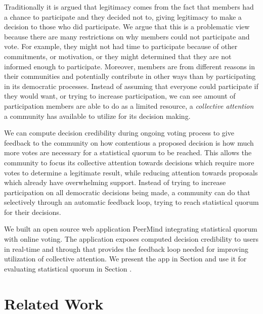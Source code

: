 \documentclass[chi_draft]{sigchi}
\begin{document}
Traditionally it is argued that legitimacy comes from the fact that members had a chance to participate
and they decided not to, giving legitimacy to make a decision to those who did participate.
We argue that this is a problematic view because there are many restrictions on why members could not
participate and vote.
For example, they might not had time to participate because of other commitments, or motivation, or they might determined
that they are not informed enough to participate.
Moreover, members are from different reasons in their communities and potentially contribute in other ways
than by participating in its democratic processes.
Instead of assuming that everyone could participate if they would want, or trying to increase participation,
we can see amount of participation members are able to do as a limited resource, a \emph{collective attention}
a community has available to utilize for its decision making.

We can compute decision credibility during ongoing voting process to give feedback to the community
on how contentious a proposed decision is how much more votes are necessary for a statistical quorum
to be reached.
This allows the community to focus its collective attention towards decisions which require more votes
to determine a legitimate result, while reducing attention towards proposals which already have overwhelming support.
Instead of trying to increase participation on all democratic decisions being made, a community can
do that selectively through an automatic feedback loop, trying to reach statistical quorum for their decisions.

We built an open source web application PeerMind integrating statistical quorum with online voting.
The application exposes computed decision credibility to users in real-time and through that provides
the feedback loop needed for improving utilization of collective attention.
We present the app in Section  and use it for evaluating statistical quorum in
Section .



\section{Related Work}
\end{document}
